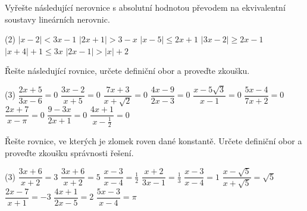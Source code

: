\documentclass[12pt,a4paper]{article}
\begin{document}
\begin{exercise}
  Vyřešte následující nerovnice s absolutní hodnotou převodem na ekvivalentní soustavy lineárních nerovnic.
  \begin{tasks}(2)
    \task \(|x - 2| < 3x - 1\)
    \task \(|2x + 1| > 3 - x\)
    \task \(|x - 5| \le 2x + 1\)
    \task \(|3x - 2| \ge 2x - 1\)
    \task \(|x + 4| + 1 \le 3x\)
    \task \(|2x - 1| > |x| + 2\)
  \end{tasks}
\end{exercise}


\setcounter{section}{5}
\begin{exercise}
  Řešte následující rovnice, určete definiční obor a proveďte zkoušku.
  \begin{tasks}(3)
    \task \(\dfrac{2x + 5}{3x - 6} = 0\)
    \task \(\dfrac{3x - 2}{x + 5} = 0\)
    \task \(\dfrac{7x + 3}{x + \sqrt{2}} = 0\)
    \task \(\dfrac{4x - 9}{2x - 3} = 0\)
    \task \(\dfrac{x - 5\sqrt{3}}{x - 1} = 0\)
    \task \(\dfrac{5x - 4}{7x + 2} = 0\)
    \task \(\dfrac{2x + 7}{x - \pi} = 0\)
    \task \(\dfrac{9 - 3x}{2x + 1} = 0\)
    \task \(\dfrac{4x + 1}{x - \tfrac{1}{2}} = 0\)
  \end{tasks}
\end{exercise}



\begin{exercise}
  Řešte rovnice, ve kterých je zlomek roven dané konstantě.  
  Určete definiční obor a proveďte zkoušku správnosti řešení.
  \begin{tasks}(3)
    \task \(\dfrac{3x + 6}{x + 2} = 3\)
    \task \(\dfrac{3x + 6}{x + 2} = 5\)
    \task \(\dfrac{x - 3}{x - 4} = \tfrac{1}{2}\)
    \task \(\dfrac{x + 2}{3x - 1} = \tfrac{1}{3}\)
    \task \(\dfrac{x - 3}{x - 4} = 1\)
    \task \(\dfrac{x - \sqrt{5}}{x + \sqrt{5}} = \sqrt{5}\)
    \task \(\dfrac{2x - 7}{x + 1} = -3\)
    \task \(\dfrac{4x + 1}{2x - 5} = 2\)
    \task \(\dfrac{5x - 3}{x - 4} = \pi\)
  \end{tasks}
\end{exercise}
\end{document}
